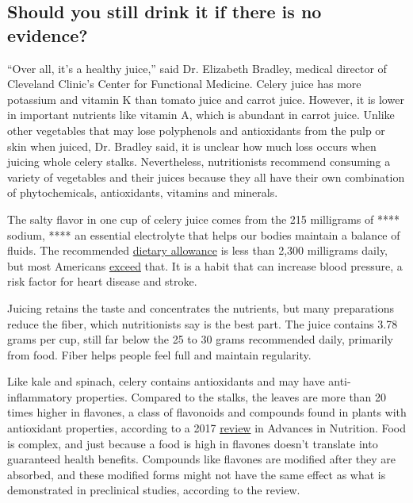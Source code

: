 \hypertarget{should-you-still-drink-it-if-there-is-no-evidence}{%
\subsection{Should you still drink it if there is no
evidence?}\label{should-you-still-drink-it-if-there-is-no-evidence}}

``Over all, it's a healthy juice,'' said Dr. Elizabeth Bradley, medical
director of Cleveland Clinic's Center for Functional Medicine. Celery
juice has more potassium and vitamin K than tomato juice and carrot
juice. However, it is lower in important nutrients like vitamin A, which
is abundant in carrot juice. Unlike other vegetables that may lose
polyphenols and antioxidants from the pulp or skin when juiced, Dr.
Bradley said, it is unclear how much loss occurs when juicing whole
celery stalks. Nevertheless, nutritionists recommend consuming a variety
of vegetables and their juices because they all have their own
combination of phytochemicals, antioxidants, vitamins and minerals.

The salty flavor in one cup of celery juice comes from the 215
milligrams of **** sodium, **** an essential electrolyte that helps our
bodies maintain a balance of fluids. The recommended
\href{https://www.cdc.gov/salt/pdfs/sodium_dietary_guidelines.pdf}{dietary
allowance} is less than 2,300 milligrams daily, but most Americans
\href{https://www.cdc.gov/salt/pdfs/Sodium_Fact_Sheet.pdf}{exceed} that.
It is a habit that can increase blood pressure, a risk factor for heart
disease and stroke.

Juicing retains the taste and concentrates the nutrients, but many
preparations reduce the fiber, which nutritionists say is the best part.
The juice contains 3.78 grams per cup, still far below the 25 to 30
grams recommended daily, primarily from food. Fiber helps people feel
full and maintain regularity.

Like kale and spinach, celery contains antioxidants and may have
anti-inflammatory properties. Compared to the stalks, the leaves are
more than 20 times higher in flavones, a class of flavonoids and
compounds found in plants with antioxidant properties, according to a
2017
\href{https://www.ncbi.nlm.nih.gov/pmc/articles/PMC5421117/\#!po=42.5926}{review}
in Advances in Nutrition. Food is complex, and just because a food is
high in flavones doesn't translate into guaranteed health benefits.
Compounds like flavones are modified after they are absorbed, and these
modified forms might not have the same effect as what is demonstrated in
preclinical studies, according to the review.

